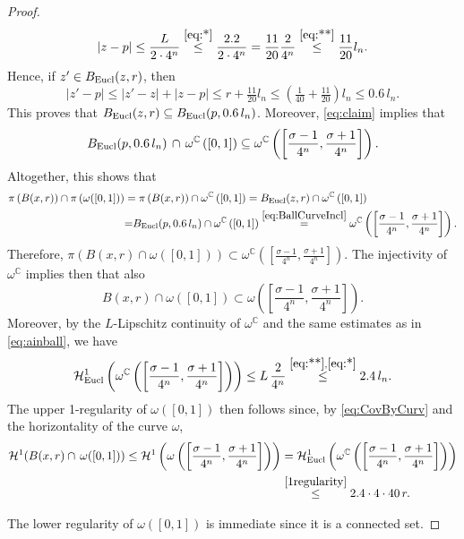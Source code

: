\documentclass[12pt]{amsart}
\newcommand{\C}{\mathbb C}
\numberwithin{equation}{section}
\theoremstyle{plain}
\theoremstyle{definition}
\theoremstyle{remark}
\begin{document}
\begin{proof}
  \[|z-p|\leq \frac{L}{2\cdot 4^n}\overset{\eqref{eq:*}}{\leq} \frac{2.2}{2\cdot 4^n}=\frac{11}{20}\frac{2}{4^n}\overset{\eqref{eq:**}}{\leq} \frac{11}{20}l_n.\]
  Hence, if $z'\in B_{\rm Eucl}(z,r)$, then
  \[|z'-p|\leq |z'-z|+|z-p|\leq r+\tfrac{11}{20} l_n\leq \left(\tfrac{1}{40}+\tfrac{11}{20}\right)l_n\leq 0.6\, l_n.\]
  This proves that $B_{\rm Eucl}(z,r)\subseteq B_{\rm Eucl}(p,0.6\,l_n)$. Moreover, \eqref{eq:claim} implies that
  \begin{equation}\label{eq:BallCurveIncl}
B_{\rm Eucl}(p,0.6\, l_n)\,\cap\,\omega^\C\left([0,1]\right)\subseteq \omega^\C\left(\left[\frac{\sigma-1}{4^n},\frac{\sigma +1}{4^n}\right]\right).
  \end{equation}
  Altogether, this shows that
  \begin{align*}
      \pi\left(B(x,r)\right)\cap \pi\left(\omega([0,1])\right)
     & = \pi\left(B(x,r)\right)\cap \omega^{\mathbb{C}}\left([0,1] \right)=B_{\mathrm{Eucl}}(z,r)\cap \omega^{\mathbb{C}}\left([0,1]\right)\\
  &{=}  B_{\rm Eucl}(p,0.6\,l_n)\cap \omega^{\mathbb{C}}\left([0,1]\right)
 \overset{\eqref{eq:BallCurveIncl}}{=} \omega^\C\left(\left[\frac{\sigma-1}{4^n},\frac{\sigma +1}{4^n}\right]\right).
  \end{align*}
Therefore, $\pi\left(B(x,r)\cap \omega([0,1])\right)\subset \omega^\C\left(\left[\frac{\sigma-1}{4^n},\frac{\sigma +1}{4^n}\right]\right)$. The injectivity of $\omega^{\mathbb{C}}$  implies then that also
\begin{equation}\label{eq:CovByCurv}
    B(x,r)\cap \omega([0,1]) \subset \omega\left(\left[\frac{\sigma-1}{4^n},\frac{\sigma +1}{4^n}\right]\right).
\end{equation}
Moreover,
by the $L$-Lipschitz continuity of $\omega^\C$ and the same estimates as in \eqref{eq:ainball}, we have \begin{equation}\label{1regularity}\mathcal{H}^1_{\mathrm{Eucl}}\left(\omega^\C\left(\left[\frac{\sigma-1}{4^n},\frac{\sigma +1}{4^n}\right]\right)\right)\leq L\,\frac{2}{4^n}\overset{\eqref{eq:**},\eqref{eq:*}}{\leq} 2.4\,l_n.\end{equation}
The upper 1-regularity of $\omega([0,1])$ then follows since, by \eqref{eq:CovByCurv} and the horizontality of the curve $\omega$,
  \[\begin{split}\mathcal H^1(B(x,r)\cap\, \omega([0,1]))\leq \mathcal H^1\left(\omega\left(\left[\frac{\sigma-1}{4^n},\frac{\sigma +1}{4^n}\right]\right)\right)&= \mathcal{H}^1_{\mathrm{Eucl}}\left(\omega^{\mathbb{C}}\left(\left[\frac{\sigma-1}{4^n},\frac{\sigma +1}{4^n}\right]\right)\right)\\&\overset{\eqref{1regularity}}{\leq} 2.4\cdot 4\cdot 40 \,r.\end{split}\]
 
  The lower regularity of $\omega([0,1])$ is immediate since it is a  connected set.
\end{proof}
\end{document}
